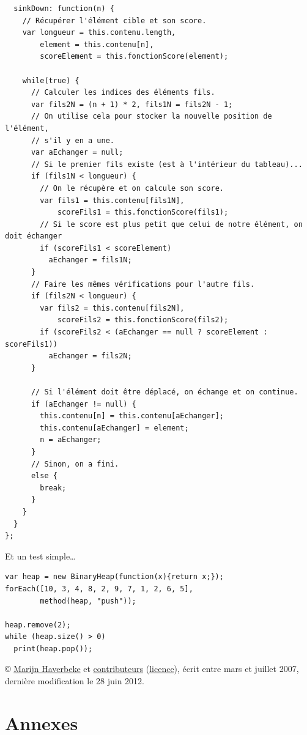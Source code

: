 \documentclass{FramateX}
\begin{document}
\begin{lstlisting}
  sinkDown: function(n) {
    // Récupérer l'élément cible et son score.
    var longueur = this.contenu.length,
        element = this.contenu[n],
        scoreElement = this.fonctionScore(element);

    while(true) {
      // Calculer les indices des éléments fils.
      var fils2N = (n + 1) * 2, fils1N = fils2N - 1;
      // On utilise cela pour stocker la nouvelle position de l'élément,
      // s'il y en a une.
      var aEchanger = null;
      // Si le premier fils existe (est à l'intérieur du tableau)...
      if (fils1N < longueur) {
        // On le récupère et on calcule son score.
        var fils1 = this.contenu[fils1N],
            scoreFils1 = this.fonctionScore(fils1);
        // Si le score est plus petit que celui de notre élément, on doit échanger
        if (scoreFils1 < scoreElement)
          aEchanger = fils1N;
      }
      // Faire les mêmes vérifications pour l'autre fils.
      if (fils2N < longueur) {
        var fils2 = this.contenu[fils2N],
            scoreFils2 = this.fonctionScore(fils2);
        if (scoreFils2 < (aEchanger == null ? scoreElement : scoreFils1))
          aEchanger = fils2N;
      }

      // Si l'élément doit être déplacé, on échange et on continue.
      if (aEchanger != null) {
        this.contenu[n] = this.contenu[aEchanger];
        this.contenu[aEchanger] = element;
        n = aEchanger;
      }
      // Sinon, on a fini.
      else {
        break;
      }
    }
  }
};
\end{lstlisting}
Et un test simple\ldots{}

\begin{lstlisting}
var heap = new BinaryHeap(function(x){return x;});
forEach([10, 3, 4, 8, 2, 9, 7, 1, 2, 6, 5],
        method(heap, "push"));

heap.remove(2);
while (heap.size() > 0)
  print(heap.pop());
\end{lstlisting}

© \href{mailto:marijnh@gmail.com}{Marijn Haverbeke} et
\href{contributors.html}{contributeurs}
(\href{http://creativecommons.org/licenses/by/3.0/deed.fr}{licence}),
écrit entre mars et juillet 2007, dernière modification le 28 juin 2012.

                        
                        
%


\appendix
\part*{Annexes}
\end{document}
